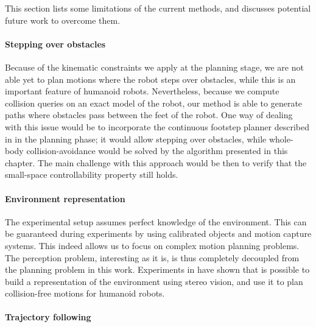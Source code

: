 This section lists some limitations of the current methods, and
discusses potential future work to overcome them.

\paragraph{Stepping over obstacles}

Because of the kinematic constraints we apply at the planning stage,
we are not able yet to plan motions where the robot steps over
obstacles, while this is an important feature of humanoid
robots. Nevertheless, because we compute collision queries on an exact
model of the robot, our method is able to generate paths where
obstacles pass between the feet of the robot. One way of dealing with
this issue would be to incorporate the continuous footstep planner
described in \cite{perr11b} in the planning phase; it would allow
stepping over obstacles, while whole-body collision-avoidance would be
solved by the algorithm presented in this chapter. The main challenge
with this approach would be then to verify that the small-space
controllability property still holds.

\paragraph{Environment representation}

The experimental setup assumes perfect knowledge of the
environment. This can be guaranteed during experiments by using
calibrated objects and motion capture systems. This indeed allows us
to focus on complex motion planning problems. The perception problem,
interesting as it is, is thus completely decoupled from the planning
problem in this work. Experiments in
\cite{Nakhei4755945,DanLauLam2012} have shown that is possible to
build a representation of the environment using stereo vision, and use
it to plan collision-free motions for humanoid robots.

\paragraph{Trajectory following}

